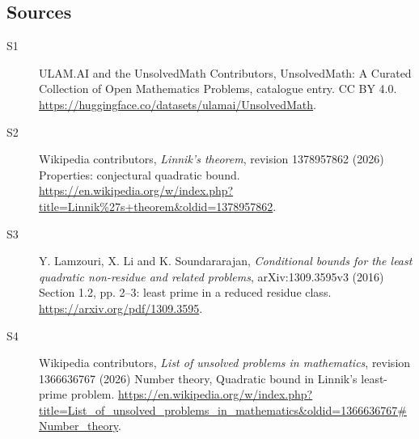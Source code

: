 \documentclass[11pt]{article}
\begin{document}
\subsection{Sources}
\begin{description}
\item[\hypertarget{source:statement:1}{S1}] ULAM.AI and the UnsolvedMath Contributors, UnsolvedMath: A Curated Collection of Open Mathematics Problems, catalogue entry. CC BY 4.0. \url{https://huggingface.co/datasets/ulamai/UnsolvedMath}.
\item[\hypertarget{source:statement:2}{S2}] Wikipedia contributors, \emph{Linnik's theorem}, revision 1378957862 (2026) Properties: conjectural quadratic bound. \url{https://en.wikipedia.org/w/index.php?title=Linnik%27s+theorem&oldid=1378957862}.
\item[\hypertarget{source:statement:3}{S3}] Y. Lamzouri, X. Li and K. Soundararajan, \emph{Conditional bounds for the least quadratic non-residue and related problems}, arXiv:1309.3595v3 (2016) Section 1.2, pp. 2--3: least prime in a reduced residue class. \url{https://arxiv.org/pdf/1309.3595}.
\item[\hypertarget{source:statement:4}{S4}] Wikipedia contributors, \emph{List of unsolved problems in mathematics}, revision 1366636767 (2026) Number theory, Quadratic bound in Linnik's least-prime problem. \url{https://en.wikipedia.org/w/index.php?title=List_of_unsolved_problems_in_mathematics&oldid=1366636767#Number_theory}.
\end{description}
\label{end:statement}
\end{document}
